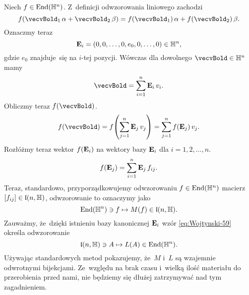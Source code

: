 \documentclass[a4paper,11pt]{article}
\numberwithin{equation}{section}
\begin{document}
Niech $f \in \mathrm{End}( \mathbb{H}^{ n } )$. Z~definicji odwzorowania liniowego zachodzi
\begin{equation}
  \label{eq:Wojtynski-62}
  f( \vecvBold_{ 1 } \, \alpha + \vecvBold_{ 2 } \, \beta ) =
  f( \vecvBold_{ 1 } ) \, \alpha + f( \vecvBold_{ 2 } ) \, \beta.
\end{equation}
Oznaczmy teraz
\begin{equation}
  \label{eq:Wojtynski-63}
  \mathbf{E}_{ i } = ( 0, 0, \ldots, 0, e_{ 0 }, 0, \ldots, 0 ) \in \mathbb{H}^{ n },
\end{equation}
gdzie $e_{ 0 }$ znajduje~się na $i$-tej pozycji. Wówczas dla dowolnego
$\vecvBold \in \Hbb^{ n }$ mamy
\begin{equation}
  \label{eq:Wojtynski-64}
  \vecvBold = \sum_{ i = 1 }^{ n } \vecEbold_{ i } \, v_{ i }.
\end{equation}
Obliczmy teraz $f( \vecvBold )$.
\begin{equation}
  \label{eq:Wojtynski-65}
  f( \vecvBold ) =
  f\!\left( \sum_{ j = 1 }^{ n } \vecEbold_{ j } \, v_{ j } \right) =
  \sum_{ j = 1 }^{ n } f( \vecEbold_{ j } ) \, v_{ j }.
\end{equation}
Rozłóżmy teraz wektor $f( \mathbf{E}_{ i } )$ na wektory bazy
$\mathbf{E}_{ i }$ dla $i = 1, 2, \ldots, n$.
\begin{equation}
  \label{eq:Wojtynski-66}
  f( \mathbf{E}_{ j } ) = \sum_{ i = 1 }^{ n } \mathbf{E}_{ j } \, f_{ i j }.
\end{equation}
Teraz, standardowo, przyporządkowujemy odwzorowaniu $f \in \mathrm{End}( \mathbb{H}^{ n } )$
macierz $[ f_{ i j } ] \in \mathfrak{l}( n, \mathbb{H} )$, odwzorowanie to oznaczymy jako
\begin{equation}
  \label{eq:Wojtynski-67}
  \mathrm{End}( \mathbb{H}^{ n } ) \ni f \mapsto M( f ) \in \mathfrak{l}( n, \mathbb{H} ).
\end{equation}
Zauważmy, że~dzięki istnieniu bazy kanonicznej $\mathbf{E}_{ i }$ wzór
\eqref{eq:Wojtynski-59} określa odwzorowanie
\begin{equation}
  \label{eq:Wojtynski-68}
  \mathfrak{l}( n, \mathbb{H} ) \ni A \mapsto L( A ) \in \mathrm{End}( \mathbb{H}^{ n } ).
\end{equation}
Używając standardowych metod pokazujemy, że~$M$ i~$L$ są wzajemnie
odwrotnymi bijekcjami. Ze~względu na brak czasu i~wielką ilość materiału do
przerobienia przed nami, nie będziemy się dłużej zatrzymywać nad tym
zagadnieniem.
\end{document}
